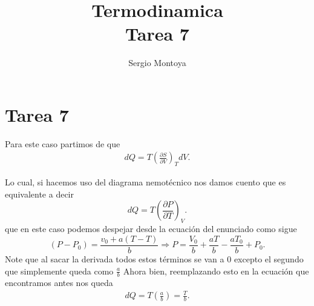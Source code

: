 \documentclass{report}
\title{\Huge{Termodinamica}\\Tarea 7}
\author{\huge{Sergio Montoya}}
\date{}
\begin{document}
\maketitle
\newpage%
\tableofcontents
\pagebreak

\chapter{Tarea 7}

\sol

Para este caso partimos de que 
\begin{align*}
  dQ = T\left( \frac{\partial S}{\partial V} \right)_T dV 
.\end{align*}

Lo cual, si hacemos uso del diagrama nemotécnico nos damos cuento que es equivalente a decir \[
  dQ = T\left( \frac{\partial P}{\partial T} \right)_V 
.\] que en este caso podemos despejar desde la ecuación del enunciado como sigue \[
(P-P_0)=\frac{v_0+a(T-T)}{b} \Rightarrow P=\frac{V_0}{b}+\frac{aT}{b}-\frac{aT_0}{b}+P_0
.\] Note que al sacar la derivada todos estos términos se van a $0$ excepto el segundo que simplemente queda como  $\frac{a}{b}$ Ahora bien, reemplazando esto en la ecuación que encontramos antes nos queda
\begin{align*}
  dQ = T\left( \frac{a}{b} \right) = \frac{T}{b}
.\end{align*}


\sol
\end{document}
